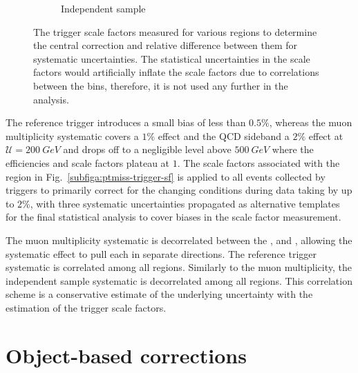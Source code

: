 \begin{figure}[htb]
\begin{subfigure}[b]{0.45\textwidth}
        \caption{Independent sample}
        \label{subfigc:ptmiss-trigger-sf}
    \end{subfigure}
    \caption[Systematic uncertainties associated with the missing energy trigger efficiency measurements.]{
        The \ptmiss trigger scale factors measured for various regions to determine the central correction and relative difference between them for systematic uncertainties. The statistical uncertainties in the scale factors would artificially inflate the scale factors due to correlations between the bins, therefore, it is not used any further in the analysis.
    }
    \label{fig:ptmiss-trigger-sf}
\end{figure}
%
The reference trigger introduces a small bias of less than $0.5\%$, whereas the muon multiplicity systematic covers a $1\%$ effect and the QCD sideband a $2\%$ effect at ${\mathcal{U}=\SI{200}{GeV}}$ and drops off to a negligible level above $\SI{500}{GeV}$ where the efficiencies and scale factors plateau at $1$. The scale factors associated with the \muplusjets region in Fig.~\ref{subfiga:ptmiss-trigger-sf} is applied to all events collected by \ptmiss triggers to primarily correct for the changing conditions during data taking by up to $2\%$, with three systematic uncertainties propagated as alternative templates for the final statistical analysis to cover biases in the scale factor measurement.

The muon multiplicity systematic is decorrelated between the \metplusjets, \muplusjets and \dimuplusjets, allowing the systematic effect to pull each in separate directions. The reference trigger systematic is correlated among all regions. Similarly to the muon multiplicity, the independent sample systematic is decorrelated among all regions. This correlation scheme is a conservative estimate of the underlying uncertainty with the estimation of the \ptmiss trigger scale factors.

\section{Object-based corrections}

